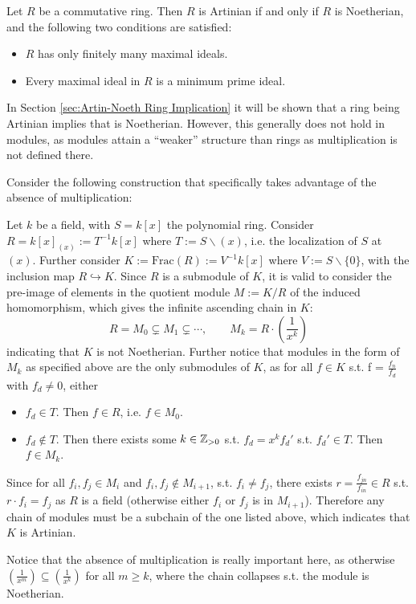 \documentclass{article}
\begin{document}
\begin{theorem}\label{thm:Criterion for Artinian ring}
    Let $R$ be a commutative ring. Then $R$ is Artinian if and only if $R$ is Noetherian, and the following two conditions are satisfied:
    \begin{itemize}
        \item $R$ has only finitely many maximal ideals.
        \item Every maximal ideal in $R$ is a minimum prime ideal. 
    \end{itemize}
\end{theorem}

\begin{remark}
    In Section \ref{sec:Artin-Noeth Ring Implication} it will be shown that a ring being Artinian implies that is Noetherian. However, this generally does not hold in modules, as modules attain a ``weaker'' structure than rings as multiplication is not defined there.

    Consider the following construction that specifically takes advantage of the absence of multiplication:
    
    Let $k$ be a field, with $S = k[x]$ the polynomial ring. Consider $R = k[x]_{(x)} := T^{-1}k[x]$ where $T := S\smallsetminus (x)$, i.e. the localization of $S$ at $(x)$. Further consider $K := \mathrm{Frac}(R) := V^{-1}k[x]$ where $V := S\smallsetminus \{0\}$, with the inclusion map $R \hookrightarrow K$. Since $R$ is a submodule of $K$, it is valid to consider the pre-image of elements in the quotient module $M := K/R$ of the induced homomorphism, which gives the infinite ascending chain in $K$:
    \[
        R = M_0 \subsetneq M_1 \subsetneq \cdots, \qquad M_k = R\cdot\left( \frac{1}{x^k} \right)
    \]
    indicating that $K$ is not Noetherian. Further notice that modules in the form of $M_k$ as specified above are the only submodules of $K$, as for all $f\in K$ s.t. f = $\frac{f_n}{f_d}$ with $f_d \neq 0$, either
    \begin{itemize}
        \item $f_d \in T$. Then $f\in R$, i.e. $f\in M_0$.
        \item $f_d \notin T$. Then there exists some $k\in\mathbb{Z}_{>0}$ s.t. $f_d = x^k f_d'$ s.t. $f_d'\in T$. Then $f\in M_k$.
    \end{itemize}
    Since for all $f_i, f_j \in M_i$ and $f_i, f_j \notin M_{i+1}$, s.t. $f_i \neq f_j$, there exists $r = \frac{f_{jn}}{f_{in}}\in R$ s.t. $r\cdot f_i = f_j$ as $R$ is a field (otherwise either $f_i$ or $f_j$ is in $M_{i+1}$). Therefore any chain of modules must be a subchain of the one listed above, which indicates that $K$ is Artinian.

    Notice that the absence of multiplication is really important here, as otherwise $(\frac{1}{x^m}) \subseteq (\frac{1}{x^k})$ for all $m \geq k$, where the chain collapses s.t. the module is Noetherian. 
\end{remark}
\end{document}
